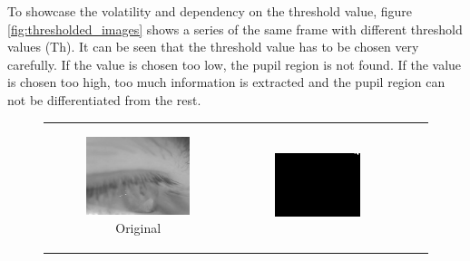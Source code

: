 To showcase the volatility and dependency on the threshold value, figure \ref{fig:thresholded_images} shows a series of the same frame with different threshold values (Th). It can be seen that the threshold value has to be chosen very carefully. If the value is chosen too low, the pupil region is not found. If the value is chosen too high, too much information is extracted and the pupil region can not be differentiated from the rest. 


\begin{figure}[htbp]
    \centering
    \begin{tabular}{cccc}
    \begin{subfigure}{0.2\linewidth}
    \centering
    \includegraphics[width=\linewidth]{plots/thresholding/thresholded_eyelid.jpg}
    \caption{Original}
    \end{subfigure} &
    \begin{subfigure}{0.2\linewidth}
    \centering
    \includegraphics[width=\linewidth]{plots/thresholding/th1}

\end{subfigure}
\end{tabular}
\end{figure}
